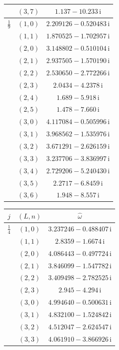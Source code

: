 \begin{table}[H]
\begin{minipage}[t]{0.325\textwidth}
\begin{tabular}[t]{|c|c|c|}
 & $(3,7)$ & $1.137-10.233\,\mathrm{i}$ \\
\hline
$\tfrac19$ & $(1,0)$ & $2.209126-0.520483\,\mathrm{i}$ \\
 & $(1,1)$ & $1.870525-1.702957\,\mathrm{i}$ \\
 & $(2,0)$ & $3.148802-0.510104\,\mathrm{i}$ \\
 & $(2,1)$ & $2.937505-1.570190\,\mathrm{i}$ \\
 & $(2,2)$ & $2.530650-2.772266\,\mathrm{i}$ \\
 & $(2,3)$ & $2.0434-4.2378\,\mathrm{i}$ \\
 & $(2,4)$ & $1.689-5.918\,\mathrm{i}$ \\
 & $(2,5)$ & $1.478-7.660\,\mathrm{i}$ \\
 & $(3,0)$ & $4.117084-0.505996\,\mathrm{i}$ \\
 & $(3,1)$ & $3.968562-1.535976\,\mathrm{i}$ \\
 & $(3,2)$ & $3.671291-2.626159\,\mathrm{i}$ \\
 & $(3,3)$ & $3.237706-3.836997\,\mathrm{i}$ \\
 & $(3,4)$ & $2.729206-5.240430\,\mathrm{i}$ \\
 & $(3,5)$ & $2.2717-6.8459\,\mathrm{i}$ \\
 & $(3,6)$ & $1.948-8.557\,\mathrm{i}$ \\
\hline
\end{tabular}
\end{minipage}\hfill
\begin{minipage}[t]{0.325\textwidth}
\centering
\begin{tabular}[t]{|c|c|c|}
\hline
$j$ & $(L,n)$ & $\widehat{\omega}$ \\
\hline
$\tfrac14$ & $(1,0)$ & $3.237246-0.488407\,\mathrm{i}$ \\
 & $(1,1)$ & $2.8359-1.6674\,\mathrm{i}$ \\
 & $(2,0)$ & $4.086443-0.497724\,\mathrm{i}$ \\
 & $(2,1)$ & $3.846099-1.547782\,\mathrm{i}$ \\
 & $(2,2)$ & $3.409498-2.782525\,\mathrm{i}$ \\
 & $(2,3)$ & $2.945-4.294\,\mathrm{i}$ \\
 & $(3,0)$ & $4.994640-0.500631\,\mathrm{i}$ \\
 & $(3,1)$ & $4.832100-1.524842\,\mathrm{i}$ \\
 & $(3,2)$ & $4.512047-2.624547\,\mathrm{i}$ \\
 & $(3,3)$ & $4.061910-3.866926\,\mathrm{i}$ \\

\end{tabular}
\end{minipage}
\end{table}
